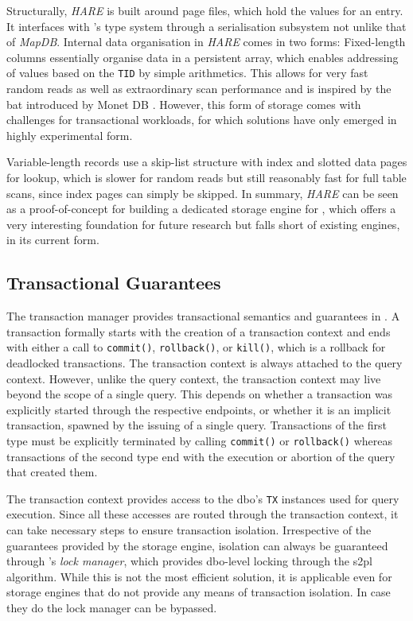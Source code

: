 Structurally, \emph{HARE} is built around page files, which hold the values for an entry. It interfaces with \cottontail{}'s type system through a serialisation subsystem not unlike that of \emph{MapDB}. Internal data organisation in \emph{HARE} comes in two forms: Fixed-length columns essentially organise data in a persistent array, which enables addressing of values based on the \texttt{TID} by simple arithmetics. This allows for very fast random reads as well as extraordinary scan performance and is inspired by the \acrshort{bat} introduced by Monet DB \cite{Idreos:2012MonetDB}. However, this form of storage comes with challenges for transactional workloads, for which solutions have only emerged in highly experimental form.

Variable-length records use a skip-list structure with index and slotted data pages for lookup, which is slower for random reads but still reasonably fast for full table scans, since index pages can simply be skipped. In summary, \emph{HARE} can be seen as a proof-of-concept for building a dedicated storage engine for \cottontail, which offers a very interesting foundation for future research but falls short of existing engines, in its current form.

\subsection{Transactional Guarantees}

The transaction manager provides transactional semantics and guarantees in \cottontail. A transaction formally starts with the creation of a transaction context and ends with either a call to \texttt{commit()}, \texttt{rollback()}, or \texttt{kill()}, which is a rollback for deadlocked transactions. The transaction context is always attached to the query context. However, unlike the query context, the transaction context may live beyond the scope of a single query. This depends on whether a transaction was explicitly started through the respective endpoints, or whether it is an implicit transaction, spawned by the issuing of a single query. Transactions of the first type must be explicitly terminated by calling  \texttt{commit()} or \texttt{rollback()} whereas transactions of the second type end with the execution or abortion of the query that created them.

The transaction context provides access to the \acrshort{dbo}'s \texttt{TX} instances used for query execution. Since all these accesses are routed through the transaction context, it can take necessary steps to ensure transaction isolation. Irrespective of the guarantees provided by the storage engine, isolation can always be guaranteed through \cottontail{}'s \emph{lock manager}, which provides \acrshort{dbo}-level locking through the \acrshort{s2pl} algorithm. While this is not the most efficient solution, it is applicable even for storage engines that do not provide any means of transaction isolation. In case they do the lock manager can be bypassed.

